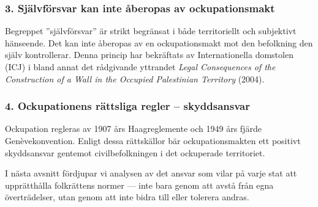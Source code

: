 
\subsubsection*{3. Självförsvar kan inte åberopas av ockupationsmakt}

Begreppet ”självförsvar” är strikt begränsat i både territoriellt och subjektivt hänseende. 
Det kan inte åberopas av en ockupationsmakt mot den befolkning den själv kontrollerar. 
Denna princip har bekräftats av Internationella domstolen (ICJ) i bland annat det rådgivande 
yttrandet \textit{Legal Consequences of the Construction of a Wall in the Occupied Palestinian Territory} (2004).

\subsubsection*{4. Ockupationens rättsliga regler – skyddsansvar}

Ockupation regleras av 1907 års Haagreglemente och 1949 års fjärde Genèvekonvention. 
Enligt dessa rättskällor bär ockupationsmakten ett positivt skyddsansvar gentemot civilbefolkningen i 
det ockuperade territoriet.



\medskip

\medskip

\noindent
I nästa avsnitt fördjupar vi analysen av det ansvar som vilar på varje stat att upprätthålla folkrättens normer — inte bara genom att avstå från egna överträdelser, utan genom att inte bidra till eller tolerera andras. 


